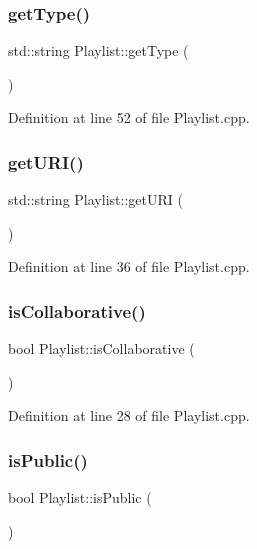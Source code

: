 \subsubsection{\texorpdfstring{get\+Type()}{getType()}}
{\footnotesize\ttfamily std\+::string Playlist\+::get\+Type (\begin{DoxyParamCaption}{ }\end{DoxyParamCaption})}



Definition at line 52 of file Playlist.\+cpp.

\mbox{\label{class_playlist_a3bb9e2e9ec7234053842a504dcf4b1e5}} 
\subsubsection{\texorpdfstring{get\+U\+R\+I()}{getURI()}}
{\footnotesize\ttfamily std\+::string Playlist\+::get\+U\+RI (\begin{DoxyParamCaption}{ }\end{DoxyParamCaption})}



Definition at line 36 of file Playlist.\+cpp.

\mbox{\label{class_playlist_a49effd021d8ac190376d7e0c75a37699}} 
\subsubsection{\texorpdfstring{is\+Collaborative()}{isCollaborative()}}
{\footnotesize\ttfamily bool Playlist\+::is\+Collaborative (\begin{DoxyParamCaption}{ }\end{DoxyParamCaption})}



Definition at line 28 of file Playlist.\+cpp.

\mbox{\label{class_playlist_a088b240198be8e420f364acceeb14472}} 
\subsubsection{\texorpdfstring{is\+Public()}{isPublic()}}
{\footnotesize\ttfamily bool Playlist\+::is\+Public (\begin{DoxyParamCaption}{ }\end{DoxyParamCaption})}



